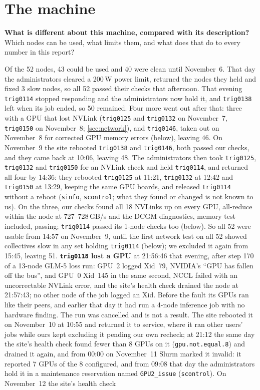 \section{The machine}
\label{sec:machine}

\begin{question}
  \textbf{What is different about this machine, compared with its description?} Which nodes can be used, what limits them, and what
  does that do to every number in this report?
\end{question}

Of the 52 nodes, 43 could be used and 40 were clean until November~6. That day the administrators cleared a 200\,W power limit, returned the nodes they held and fixed 3 slow nodes, so all 52 passed their checks that afternoon. That evening \texttt{trig0114} stopped responding and the administrators now hold it, and \texttt{trig0138} left when its job ended, so 50 remained. Four more went out after that: three with a GPU that lost NVLink (\texttt{trig0125} and \texttt{trig0132} on November~7, \texttt{trig0150} on November~8; \cref{sec:network}), and \texttt{trig0146}, taken out on November~8 for corrected GPU memory errors (below), leaving 46. On November~9 the site rebooted \texttt{trig0138} and \texttt{trig0146}, both passed our checks, and they came back at 10:06, leaving 48. The administrators then took \texttt{trig0125}, \texttt{trig0132} and \texttt{trig0150} for an NVLink check and held \texttt{trig0114}, and returned all four by 14:36: they rebooted \texttt{trig0125} at 11:21, \texttt{trig0132} at 12:42 and \texttt{trig0150} at 13:29, keeping the same GPU boards, and released \texttt{trig0114} without a reboot (\texttt{sinfo}, \texttt{scontrol}; what they found or changed is not known to us). On the three, our checks found all 18 NVLinks up on every GPU, all-reduce within the node at 727--728\,GB/s and the DCGM diagnostics, memory test included, passing; \texttt{trig0114} passed its 1-node checks too (below). So all 52 were usable from 14:57 on November~9, until the first network test on all 52 showed collectives slow in any set holding \texttt{trig0114} (below); we excluded it again from 15:45, leaving 51. \textbf{\texttt{trig0118} lost a GPU} at 21:56:46 that evening, after step 170 of a 13-node GLM-5 loss run: GPU~2 logged Xid~79, NVIDIA's ``GPU has fallen off the bus'', and GPU~0 Xid~145 in the same second, NCCL failed with an uncorrectable NVLink error, and the site's health check drained the node at 21:57:43; no other node of the job logged an Xid. Before the fault its GPUs ran like their peers, and earlier that day it had run a 4-node inference job with no hardware finding. The run was cancelled and is not a result. The site rebooted it on November~10 at 10:55 and returned it to service, where it ran other users' jobs while ours kept excluding it pending our own recheck; at 21:12 the same day the site's health check found fewer than 8 GPUs on it (\texttt{gpu.not.equal.8}) and drained it again, and from 00:00 on November~11 Slurm marked it invalid: it reported 7 GPUs of the 8 configured, and from 09:08 that day the administrators hold it in a maintenance reservation named \texttt{GPU2\_issue} (\texttt{scontrol}). On November~12 the site's health check 